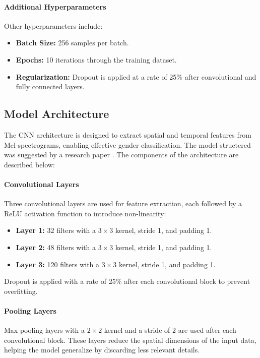\paragraph{Additional Hyperparameters}
Other hyperparameters include:
\begin{itemize}
    \item \textbf{Batch Size:} 256 samples per batch.
    \item \textbf{Epochs:} 10 iterations through the training dataset.
    \item \textbf{Regularization:} Dropout is applied at a rate of 25\% after convolutional and fully connected layers.
\end{itemize}

\subsection{Model Architecture}
The CNN architecture is designed to extract spatial and temporal features from Mel-spectrograms, enabling effective gender classification. The model structered was suggested by a research paper \cite{src}. The components of the architecture are described below:

\paragraph{Convolutional Layers}
Three convolutional layers are used for feature extraction, each followed by a ReLU activation function to introduce non-linearity:
\begin{itemize}
    \item \textbf{Layer 1:} 32 filters with a $3 \times 3$ kernel, stride 1, and padding 1.
    \item \textbf{Layer 2:} 48 filters with a $3 \times 3$ kernel, stride 1, and padding 1.
    \item \textbf{Layer 3:} 120 filters with a $3 \times 3$ kernel, stride 1, and padding 1.
\end{itemize}

Dropout is applied with a rate of 25\% after each convolutional block to prevent overfitting.

\paragraph{Pooling Layers}
Max pooling layers with a $2 \times 2$ kernel and a stride of 2 are used after each convolutional block. These layers reduce the spatial dimensions of the input data, helping the model generalize by discarding less relevant details.

